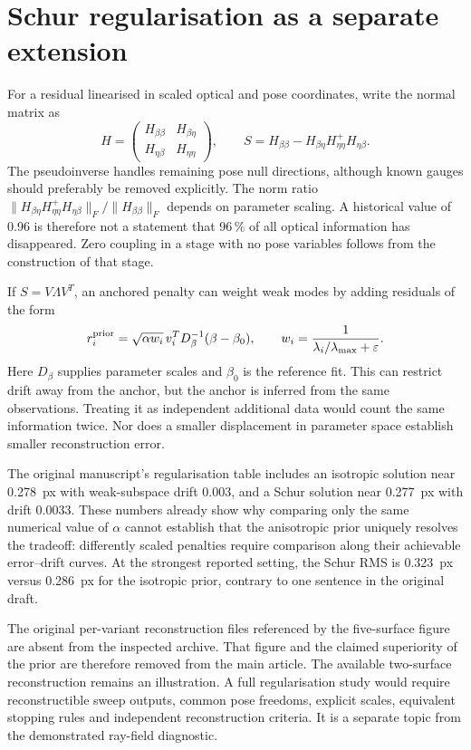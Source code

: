 \documentclass[10pt,a4paper]{article}
\begin{document}
\section{Schur regularisation as a separate extension}
For a residual linearised in scaled optical and pose coordinates, write the normal matrix as
\begin{equation}
H=\begin{pmatrix}H_{\beta\beta}&H_{\beta\eta}\\H_{\eta\beta}&H_{\eta\eta}\end{pmatrix},\qquad
S=H_{\beta\beta}-H_{\beta\eta}H_{\eta\eta}^{+}H_{\eta\beta}.
\end{equation}
The pseudoinverse handles remaining pose null directions, although known gauges should preferably be removed explicitly. The norm ratio
$\|H_{\beta\eta}H_{\eta\eta}^{+}H_{\eta\beta}\|_F/\|H_{\beta\beta}\|_F$
depends on parameter scaling. A historical value of 0.96 is therefore not a statement that 96\,\% of all optical information has disappeared. Zero coupling in a stage with no pose variables follows from the construction of that stage.

If $S=V\Lambda V^T$, an anchored penalty can weight weak modes by adding residuals of the form
\begin{equation}
r_i^{\rm prior}=\sqrt{\alpha w_i}\,v_i^TD_\beta^{-1}(\beta-\beta_0),
\qquad w_i=\frac{1}{\lambda_i/\lambda_{\max}+\varepsilon}.
\end{equation}
Here $D_\beta$ supplies parameter scales and $\beta_0$ is the reference fit. This can restrict drift away from the anchor, but the anchor is inferred from the same observations. Treating it as independent additional data would count the same information twice. Nor does a smaller displacement in parameter space establish smaller reconstruction error.

The original manuscript's regularisation table includes an isotropic solution near 0.278~px with weak-subspace drift 0.003, and a Schur solution near 0.277~px with drift 0.0033. These numbers already show why comparing only the same numerical value of $\alpha$ cannot establish that the anisotropic prior uniquely resolves the tradeoff: differently scaled penalties require comparison along their achievable error--drift curves. At the strongest reported setting, the Schur RMS is 0.323~px versus 0.286~px for the isotropic prior, contrary to one sentence in the original draft.

The original per-variant reconstruction files referenced by the five-surface figure are absent from the inspected archive. That figure and the claimed superiority of the prior are therefore removed from the main article. The available two-surface reconstruction remains an illustration. A full regularisation study would require reconstructible sweep outputs, common pose freedoms, explicit scales, equivalent stopping rules and independent reconstruction criteria. It is a separate topic from the demonstrated ray-field diagnostic.
\end{document}
